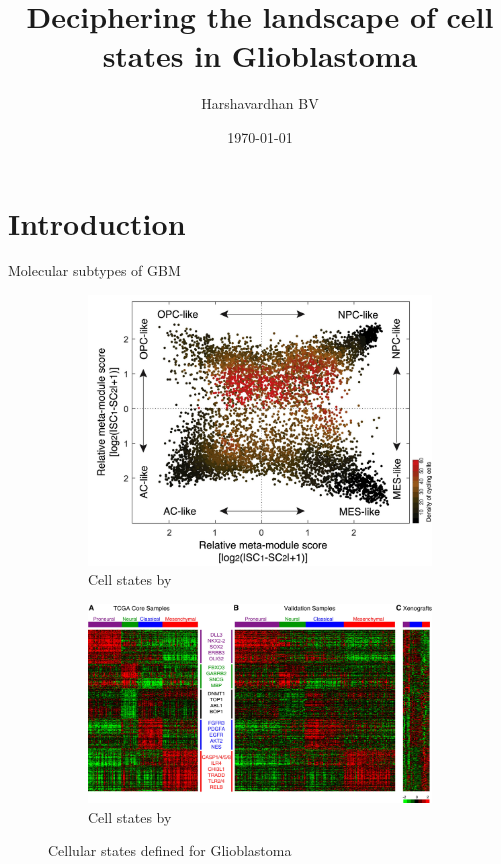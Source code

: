 \documentclass[aspectratio=169,9pt]{beamer}
\title{Deciphering the landscape of cell states in Glioblastoma}
\author{Harshavardhan BV}
\date{\today}
\institute{IISc Bangalore}
\begin{document}
    \frame{\titlepage}
    \section{Introduction}

    \begin{frame}{Molecular subtypes of GBM}
        \begin{adjustwidth}{-5cm}{-5cm}
            \centering
            \begin{figure}
                \centering
                \begin{subfigure}{0.4\textwidth}
                    \centering
                    \includegraphics[width=\textwidth]{neftel_ninja_star}
                    \caption{Cell states by \cite{Neftel}}
                \end{subfigure}
                \pause
                \begin{subfigure}{0.6\textwidth}
                    \centering
                    \includegraphics[width=\textwidth]{verhaak_clusters}
                    \caption{Cell states by \cite{Verhaak}}
                \end{subfigure}
                \pause[1]\caption{Cellular states defined for Glioblastoma}
            \end{figure}
        \end{adjustwidth}
    \end{frame}
\end{document}
